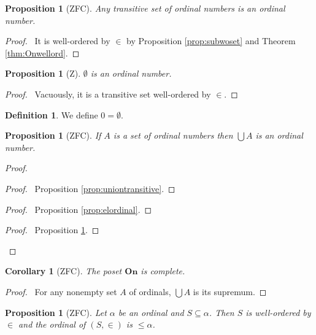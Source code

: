 \documentclass{book}
\let\qed\relax
\newtheorem{prop}[ax]{Proposition}
\newtheorem{cor}{Corollary}[ax]
\theoremstyle{definition}
\newtheorem{df}[ax]{Definition}
\begin{document}
\begin{prop}[ZFC]
\label{prop:transords}
Any transitive set of ordinal numbers is an ordinal number.
\end{prop}

\begin{proof}
\pf\ It is well-ordered by $\in$ by Proposition \ref{prop:subwoset} and Theorem \ref{thm:Onwellord}. \qed
\end{proof}

\begin{prop}[Z]
$\emptyset$ is an ordinal number.
\end{prop}

\begin{proof}
\pf\ Vacuously, it is a transitive set well-ordered by $\in$.
\end{proof}

\begin{df}
We define $0 = \emptyset$.
\end{df}

\begin{prop}[ZFC]
If $A$ is a set of ordinal numbers then $\bigcup A$ is an ordinal number.
\end{prop}

\begin{proof}
\pf
{}
\begin{proof}
	\pf\ Proposition \ref{prop:uniontransitive}.
\end{proof}
\begin{proof}
	\pf\ Proposition \ref{prop:elordinal}.
\end{proof}
\qedstep
\begin{proof}
	\pf\ Proposition \ref{prop:transords}.
\end{proof}
\qed
\end{proof}

\begin{cor}[ZFC]
The poset $\mathbf{On}$ is complete.
\end{cor}

\begin{proof}
\pf\ For any nonempty set $A$ of ordinals, $\bigcup A$ is its supremum. \qed
\end{proof}

\begin{prop}[ZFC]
\label{prop:subsetleq}
Let $\alpha$ be an ordinal and $S \subseteq \alpha$. Then $S$ is well-ordered by $\in$ and the ordinal of $(S, \in)$ is $\leq \alpha$.
\end{prop}
\end{document}
